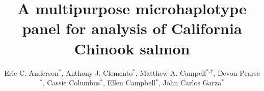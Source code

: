 

\newcommand{\myTitle}{A multipurpose microhaplotype panel for analysis of California Chinook salmon}
\title{\myTitle}

\newcommand{\myAuthors}{Eric C. Anderson$^{*,\S}$, Anthony J. Clemento$^{*}$, Matthew A. Campell$^{*,\dagger}$, Devon Pearse$^{*}$, Cassie Columbus$^{*}$, Ellen Campbell$^{*}$, John Carlos Garza$^{*}$}
\author{Eric C. Anderson$^{*}$, Anthony J. Clemento$^{*}$, Matthew A. Campell$^{*,\dagger}$, Devon Pearse$^{*}$, Cassie Columbus$^{*}$, Ellen Campbell$^{*}$, John Carlos Garza$^{*}$}


\newcommand{\myAffiliations}{
$^*$Southwest Fisheries Science Center, National Marine Fisheries Service, NOAA, Santa Cruz, California, USA. $^\dagger$Current address: Mac's home address in AK.
}

\renewcommand{\AuthorAddresses}{\myAffiliations}

\renewcommand{\KeyWords}{Genetic stock identfication, population assignment, parentage based tagging, amplicon sequencing}

\renewcommand{\CorrespondingAuthor}{eric.c.anderson@noaa.gov}


\newcommand{\myEmailAddress}{eric.c.anderson@noaa.gov}
\newcommand{\myEmailFootnote}{$^\S$}

\newcommand{\myCopyright}{\copyright US Federal Government work in the public domain in the USA}

\newcommand{\myRunningTitle}{Microhaplotypes for California Chinook salmon}
\renewcommand{\RunningTitle}{\myRunningTitle}

\newcommand{\myRunningAuthor}{Anderson et al.}

